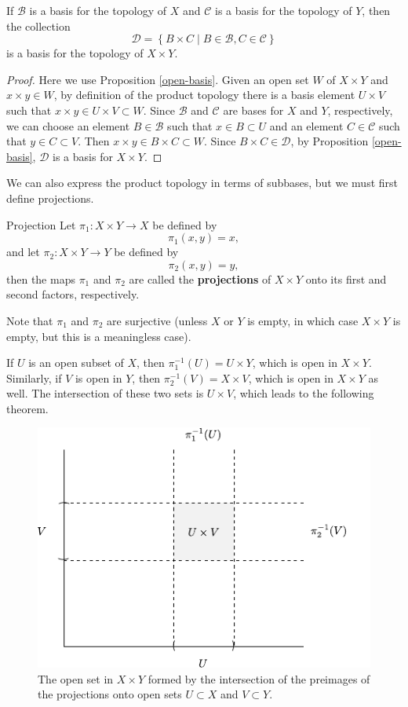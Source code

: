 \documentclass[10pt]{report}
\begin{document}
\begin{thrm}{}{}
If $\mathcal{B}$ is a basis for the topology of $X$ and $\mathcal{C}$ is a basis for the topology of $Y$, then the collection
\[
\mathcal{D}=\left\{ B\times C \;|\; B \in \mathcal{B}, C \in \mathcal{C} \right\}
\] is a basis for the topology of $X \times Y$.
\end{thrm}
\begin{proof}
	Here we use Proposition \ref{open-basis}. Given an open set $W$ of $X \times Y$ and $x \times y \in W$, by definition of the product topology there is a basis element $U \times V$ such that $x \times y \in U \times V \subset W$. Since $\mathcal{B}$ and $\mathcal{C}$ are bases for $X$ and $Y$, respectively, we can choose an element $B\in\mathcal{B}$ such that $x \in B \subset U$ and an element $C \in \mathcal{C}$ such that $y \in C \subset V$. Then $x \times y \in B \times C \subset W$. Since $B \times C \in \mathcal{D}$, by Proposition \ref{open-basis}, $\mathcal{D}$ is a basis for $X \times Y$.
\end{proof}

We can also express the product topology in terms of subbases, but we must first define projections.

\begin{defn}{Projection}{}
Let $\pi_1: X \times Y \to X$ be defined by
\[
	\pi_1(x,y) = x,
\] and let $\pi_2:X\times Y \to Y$ be defined by
\[
	\pi_2(x,y)=y,
\] then the maps $\pi_1$ and $\pi_2$ are called the \textbf{projections} of $X \times Y$ onto its first and second factors, respectively.
\end{defn}

Note that $\pi_1$ and $\pi_2$ are surjective (unless $X$ or $Y$ is empty, in which case $X \times Y$ is empty, but this is a meaningless case).

If $U$ is an open subset of $X$, then $\pi_1^{-1}(U)=U \times Y$, which is open in $X \times Y$. Similarly, if $V$ is open in $Y$, then $\pi_2^{-1}(V) = X \times V$, which is open in $X \times Y$ as well. The intersection of these two sets is $U \times V$, which leads to the following theorem.

\begin{figure}[H]
	\centering
	\includegraphics[scale=1.5]{fig/product-open.pdf}
	\caption{The open set in $X \times Y$ formed by the intersection of the preimages of the projections onto open sets $U \subset X$ and $V \subset Y$.}
\end{figure}
\end{document}
